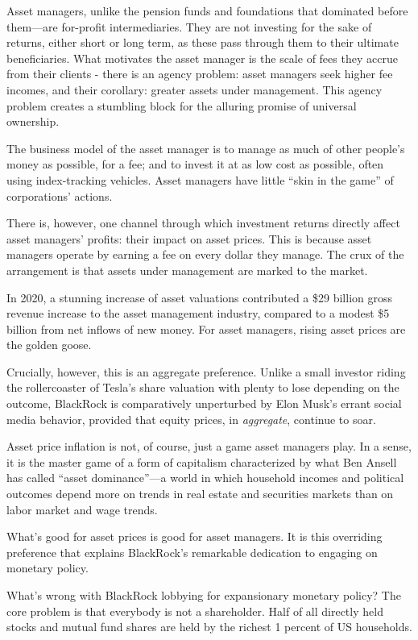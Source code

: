 \documentclass[
]{book}
\begin{document}
Asset managers, unlike the pension funds and foundations that dominated before them---are for-profit intermediaries. They are not investing for the sake of returns, either short or long term, as these pass through them to their ultimate beneficiaries. What motivates the asset manager is the scale of fees they accrue from their clients
- there is an agency problem: asset managers seek higher fee incomes, and their corollary: greater assets under management.
This agency problem creates a stumbling block for the alluring promise of universal ownership.

The business model of the asset manager is to manage as much of other people's money as possible, for a fee; and to invest it at as low cost as possible, often using index-tracking vehicles.
Asset managers have little ``skin in the game'' of corporations' actions.

There is, however, one channel through which investment returns directly affect asset managers' profits: their impact on asset prices. This is because asset managers operate by earning a fee on every dollar they manage. The crux of the arrangement is that assets under management are marked to the market.

In 2020, a stunning increase of asset valuations contributed a \$29 billion gross revenue increase to the asset management industry, compared to a modest \$5 billion from net inflows of new money. For asset managers, rising asset prices are the golden goose.

Crucially, however, this is an aggregate preference. Unlike a small investor riding the rollercoaster of Tesla's share valuation with plenty to lose depending on the outcome, BlackRock is comparatively unperturbed by Elon Musk's errant social media behavior, provided that equity prices, in \emph{aggregate}, continue to soar.

Asset price inflation is not, of course, just a game asset managers play. In a sense, it is the master game of a form of capitalism characterized by what Ben Ansell has called ``asset dominance''---a world in which household incomes and political outcomes depend more on trends in real estate and securities markets than on labor market and wage trends.

What's good for asset prices is good for asset managers. It is this overriding preference that explains BlackRock's remarkable dedication to engaging on monetary policy.

What's wrong with BlackRock lobbying for expansionary monetary policy?
The core problem is that everybody is not a shareholder.
Half of all directly held stocks and mutual fund shares are held by the richest 1 percent of US households.
\end{document}
